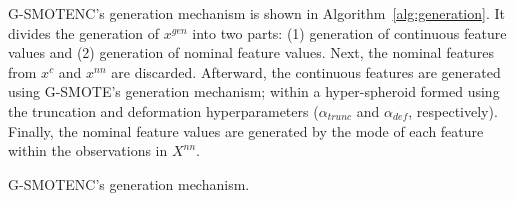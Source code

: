 \documentclass[preprint,12pt]{elsarticle}
\begin{document}
{G-SMOTENC's generation mechanism is shown in Algorithm~\ref{alg:generation}.
It divides the generation of $x^{gen}$ into two parts: (1) generation of
continuous feature values and (2) generation of nominal feature values. Next,
the nominal features from $x^c$ and $x^{nn}$ are discarded. Afterward, the
continuous features are generated using G-SMOTE's generation mechanism; within
a hyper-spheroid formed using the truncation and deformation hyperparameters
($\alpha_{trunc}$ and $\alpha_{def}$, respectively). Finally, the nominal
feature values are generated by the mode of each feature within the
observations in $X^{nn}$.

\begin{algorithm}
    \caption{G-SMOTENC's generation mechanism.}\label{alg:generation}
    \DontPrintSemicolon%









\end{algorithm}}
\end{document}
